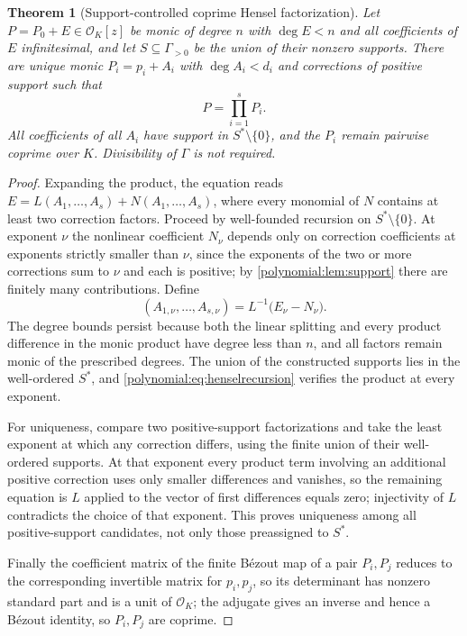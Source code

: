 \documentclass[11pt,letterpaper]{article}
\numberwithin{equation}{section}
\newtheorem{theorem}{Theorem}[section]
\theoremstyle{definition}
\theoremstyle{remark}\newtheorem{remark}[theorem]{Remark}
\newcommand{\OO}{\mathcal O}
\begin{document}
\begin{theorem}[Support-controlled coprime Hensel factorization]
\label{polynomial:thm:hensel}
Let $P=P_0+E\in\OO_K[z]$ be monic of degree $n$ with $\deg E<n$ and all
coefficients of $E$ infinitesimal, and let $S\subseteq\Gamma_{>0}$ be the
union of their nonzero supports. There are unique monic $P_i=p_i+A_i$ with
$\deg A_i<d_i$ and corrections of positive support such that
\begin{equation}\label{polynomial:eq:henselfactor}
 P=\prod_{i=1}^sP_i .
\end{equation}
All coefficients of all $A_i$ have support in $S^*\setminus\{0\}$, and the
$P_i$ remain pairwise coprime over $K$. Divisibility of $\Gamma$ is not
required.
\end{theorem}
\begin{proof}
Expanding the product, the equation reads
$E=L(A_1,\ldots,A_s)+N(A_1,\ldots,A_s)$, where every monomial of $N$ contains
at least two correction factors. Proceed by well-founded recursion on
$S^*\setminus\{0\}$. At exponent $\nu$ the nonlinear coefficient $N_\nu$
depends only on correction coefficients at exponents strictly smaller than
$\nu$, since the exponents of the two or more corrections sum to $\nu$ and
each is positive; by \cref{polynomial:lem:support} there are finitely many
contributions. Define
\begin{equation}\label{polynomial:eq:henselrecursion}
 (A_{1,\nu},\ldots,A_{s,\nu})=L^{-1}\bigl(E_\nu-N_\nu\bigr).
\end{equation}
The degree bounds persist because both the linear splitting and every product
difference in the monic product have degree less than $n$, and all factors
remain monic of the prescribed degrees. The union of the constructed supports
lies in the well-ordered $S^*$, and
\eqref{polynomial:eq:henselrecursion} verifies the product at every exponent.

For uniqueness, compare two positive-support factorizations and take the least
exponent at which any correction differs, using the finite union of their
well-ordered supports. At that exponent every product term involving an
additional positive correction uses only smaller differences and vanishes, so
the remaining equation is $L$ applied to the vector of first differences
equals zero; injectivity of $L$ contradicts the choice of that exponent. This
proves uniqueness among all positive-support candidates, not only those
preassigned to $S^*$.

Finally the coefficient matrix of the finite B\'ezout map of a pair $P_i,P_j$
reduces to the corresponding invertible matrix for $p_i,p_j$, so its
determinant has nonzero standard part and is a unit of $\OO_K$; the adjugate
gives an inverse and hence a B\'ezout identity, so $P_i,P_j$ are coprime.
\end{proof}
\end{document}
